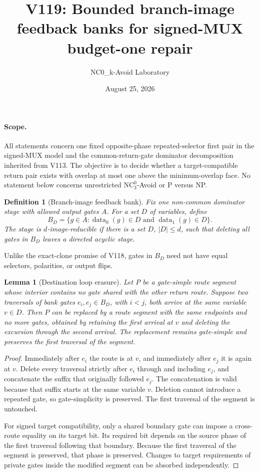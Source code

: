 \documentclass[11pt]{article}
\title{V119: Bounded branch-image feedback banks for signed-MUX budget-one repair}
\author{NC0\_k-Avoid Laboratory}
\date{August 25, 2026}
\newtheorem{definition}{Definition}
\newtheorem{lemma}{Lemma}
\begin{document}
\maketitle

\paragraph{Scope.}
All statements concern one fixed opposite-phase repeated-selector first pair in the signed-MUX model and the common-return-gate dominator decomposition inherited from V113.  The objective is to decide whether a target-compatible return pair exists with overlap at most one above the minimum-overlap face.  No statement below concerns unrestricted $\mathrm{NC}^0_3$-Avoid or P versus NP.

\begin{definition}[Branch-image feedback bank]
Fix one non-common dominator stage with allowed output gates $A$.  For a set $D$ of variables, define
\[
 B_D=\{g\in A: \operatorname{data}_0(g)\in D\text{ and }\operatorname{data}_1(g)\in D\}.
\]
The stage is \emph{$d$-image-reducible} if there is a set $D$, $|D|\le d$, such that deleting all gates in $B_D$ leaves a directed acyclic stage.
\end{definition}

Unlike the exact-clone promise of V118, gates in $B_D$ need not have equal selectors, polarities, or output flips.

\begin{lemma}[Destination loop erasure]
Let $P$ be a gate-simple route segment whose interior contains no gate shared with the other return route.  Suppose two traversals of bank gates $e_i,e_j\in B_D$, with $i<j$, both arrive at the same variable $v\in D$.  Then $P$ can be replaced by a route segment with the same endpoints and no more gates, obtained by retaining the first arrival at $v$ and deleting the excursion through the second arrival.  The replacement remains gate-simple and preserves the first traversal of the segment.
\end{lemma}

\begin{proof}
Immediately after $e_i$ the route is at $v$, and immediately after $e_j$ it is again at $v$.  Delete every traversal strictly after $e_i$ through and including $e_j$, and concatenate the suffix that originally followed $e_j$.  The concatenation is valid because that suffix starts at the same variable $v$.  Deletion cannot introduce a repeated gate, so gate-simplicity is preserved.  The first traversal of the segment is untouched.

For signed target compatibility, only a shared boundary gate can impose a cross-route equality on its target bit.  Its required bit depends on the source phase of the first traversal following that boundary.  Because the first traversal of the segment is preserved, that phase is preserved.  Changes to target requirements of private gates inside the modified segment can be absorbed independently.
\end{proof}
\end{document}
